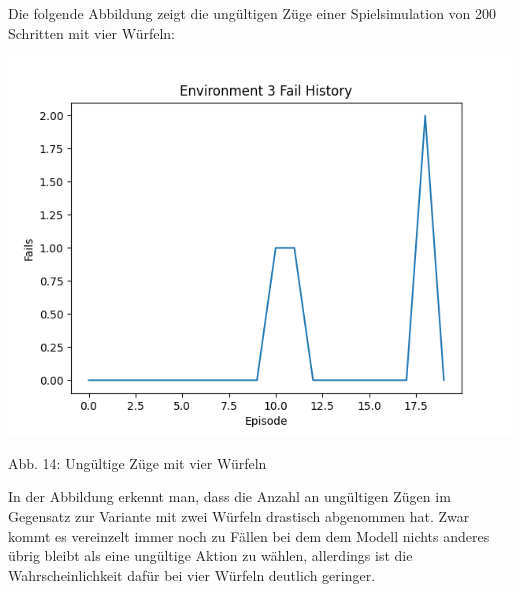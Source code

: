 \begin{minipage}{\linewidth}
Die folgende Abbildung zeigt die ungültigen Züge einer Spielsimulation von 200 Schritten mit vier Würfeln:

	\vspace{0.5cm}
	\includegraphics[width=1\textwidth]{Bilder/failswithfourdice}
	
	Abb. 14: Ungültige Züge mit vier Würfeln\\
\end{minipage}

In der Abbildung erkennt man, dass die Anzahl an ungültigen Zügen im Gegensatz zur Variante mit zwei Würfeln drastisch abgenommen hat. Zwar kommt es vereinzelt immer noch zu Fällen bei dem dem Modell nichts anderes übrig bleibt als eine ungültige Aktion zu wählen, allerdings ist die Wahrscheinlichkeit dafür bei vier Würfeln deutlich geringer.
